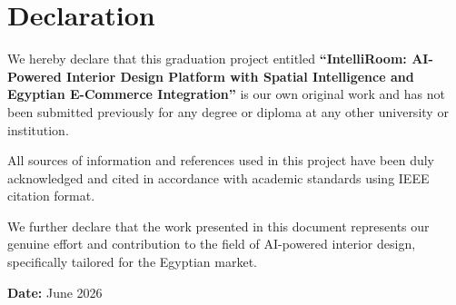 
\chapter*{Declaration}

\vspace{1cm}

We hereby declare that this graduation project entitled \textbf{``IntelliRoom: AI-Powered Interior Design Platform with Spatial Intelligence and Egyptian E-Commerce Integration''} is our own original work and has not been submitted previously for any degree or diploma at any other university or institution.

\vspace{0.5cm}

All sources of information and references used in this project have been duly acknowledged and cited in accordance with academic standards using IEEE citation format.

\vspace{0.5cm}

We further declare that the work presented in this document represents our genuine effort and contribution to the field of AI-powered interior design, specifically tailored for the Egyptian market.

\vspace{2cm}

\textbf{Date:} June 2026
